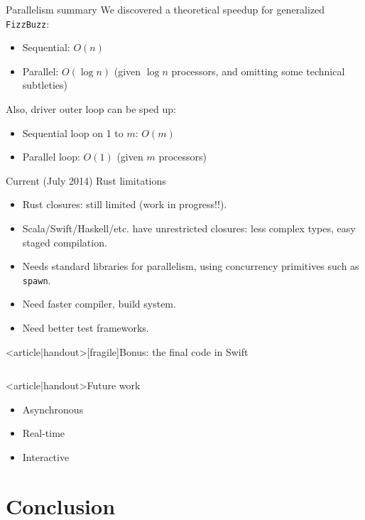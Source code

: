 \begin{frame}{Parallelism summary}
  We discovered a theoretical speedup for generalized \texttt{FizzBuzz}:
  \begin{itemize}
  \item Sequential: $O(n)$
  \item Parallel: $O(\log n)$ (given $\log n$ processors, and omitting some technical subtleties)
  \end{itemize}

  Also, driver outer loop can be sped up:
  \begin{itemize}
  \item Sequential loop on 1 to $m$: $O(m)$
  \item Parallel loop: $O(1)$ (given $m$ processors)
  \end{itemize}
\end{frame}

\begin{frame}{Current (July 2014) Rust limitations}
  \begin{itemize}
    \item Rust \alert{closures}: still limited (work in progress!!).
    \item Scala/Swift/Haskell/etc. have unrestricted closures: less complex types, easy staged \alert{compilation}.
    \item Needs standard libraries for parallelism, using concurrency primitives such as \texttt{spawn}.
    \item Need faster compiler, build system.
    \item Need better test frameworks.
  \end{itemize}
\end{frame}

\begin{frame}<article|handout>[fragile]{Bonus: the final code in Swift}
  \inputminted{swift}{FizzBuzzFinal.swift}
\end{frame}

\begin{frame}<article|handout>{Future work}
  \begin{itemize}
  \item Asynchronous
  \item Real-time
  \item Interactive
  \end{itemize}
\end{frame}

\section{Conclusion}

